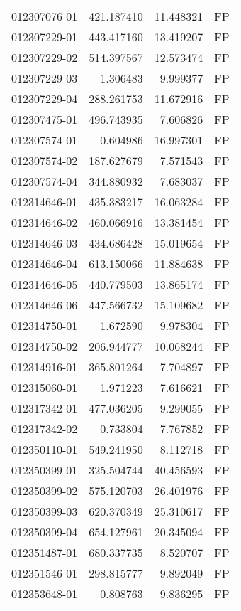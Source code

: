 \begin{tabular}{lrrl}
012307076-01 &  421.187410 &    11.448321 &   FP \\
012307229-01 &  443.417160 &    13.419207 &   FP \\
012307229-02 &  514.397567 &    12.573474 &   FP \\
012307229-03 &    1.306483 &     9.999377 &   FP \\
012307229-04 &  288.261753 &    11.672916 &   FP \\
012307475-01 &  496.743935 &     7.606826 &   FP \\
012307574-01 &    0.604986 &    16.997301 &   FP \\
012307574-02 &  187.627679 &     7.571543 &   FP \\
012307574-04 &  344.880932 &     7.683037 &   FP \\
012314646-01 &  435.383217 &    16.063284 &   FP \\
012314646-02 &  460.066916 &    13.381454 &   FP \\
012314646-03 &  434.686428 &    15.019654 &   FP \\
012314646-04 &  613.150066 &    11.884638 &   FP \\
012314646-05 &  440.779503 &    13.865174 &   FP \\
012314646-06 &  447.566732 &    15.109682 &   FP \\
012314750-01 &    1.672590 &     9.978304 &   FP \\
012314750-02 &  206.944777 &    10.068244 &   FP \\
012314916-01 &  365.801264 &     7.704897 &   FP \\
012315060-01 &    1.971223 &     7.616621 &   FP \\
012317342-01 &  477.036205 &     9.299055 &   FP \\
012317342-02 &    0.733804 &     7.767852 &   FP \\
012350110-01 &  549.241950 &     8.112718 &   FP \\
012350399-01 &  325.504744 &    40.456593 &   FP \\
012350399-02 &  575.120703 &    26.401976 &   FP \\
012350399-03 &  620.370349 &    25.310617 &   FP \\
012350399-04 &  654.127961 &    20.345094 &   FP \\
012351487-01 &  680.337735 &     8.520707 &   FP \\
012351546-01 &  298.815777 &     9.892049 &   FP \\
012353648-01 &    0.808763 &     9.836295 &   FP \\

\end{tabular}
